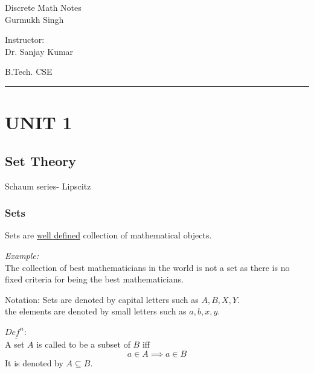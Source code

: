 \documentclass[11pt,letterpaper]{article}
\newenvironment{example}                             
        {\noindent\textit{Example:}\\}
	{}
\newenvironment{definition}
	{\begin{mdframed}$\underline{\textit{Def}^\textit{n}:} $\\}
	{\end{mdframed}}
\begin{document}
\begin{center}
  \Huge{Discrete Math Notes}\\
  \vspace{0.25cm}
  \small{Gurmukh Singh}
\end{center}

\vspace{-1.75cm}

\begin{flushright}
  Instructor: \\ Dr. Sanjay Kumar
\end{flushright}

\vspace{-1.3cm}

\begin{flushleft}
  B.Tech. CSE
\end{flushleft}

\rule{15.5cm}{0.1mm}%

\tableofcontents
\pagebreak


\section{UNIT 1}
\subsection{Set Theory}
Schaum series- Lipscitz

\subsubsection{Sets}
Sets are \underline{well defined} collection of mathematical objects.

\begin{example}
  The collection of best mathematicians in the world is not a set as there is no fixed criteria for being the best mathematicians.
\end{example}

Notation: Sets are denoted by capital letters such as $A,B,X,Y$. \\
the elements are denoted by small letters such as $a,b,x,y$. 

\begin{definition}
  A set $A$ is called to be a subset of $B$ iff
  \[
    a \in A \implies a \in B
  \]
  It is denoted by $A \subseteq B$.
\end{definition}
\end{document}
